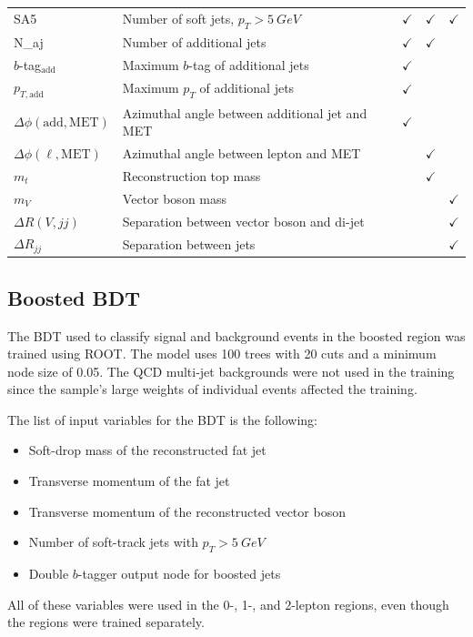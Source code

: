 \begin{table}
\begin{tabularx}{\textwidth}{|l|X|c|c|c|}
    SA5 & Number of soft jets, $p_T > \SI{5}{GeV}$ & $\checkmark$ & $\checkmark$ & $\checkmark$ \\
    N_{aj} & Number of additional jets & $\checkmark$ & $\checkmark$ & \\
    \hline
    $b$-tag$_\mathrm{add}$ & Maximum $b$-tag of additional jets & $\checkmark$ & & \\
    $p_{T,\mathrm{add}}$ & Maximum $p_T$ of additional jets & $\checkmark$ & & \\
    $\Delta\phi(\mathrm{add, MET})$ & Azimuthal angle between additional jet and MET & $\checkmark$ & & \\
    \hline
    $\Delta\phi(\ell, \mathrm{MET})$ & Azimuthal angle between lepton and MET & & $\checkmark$ & \\
    $m_t$ & Reconstruction top mass & & $\checkmark$ & \\
    $m_V$ & Vector boson mass & & & $\checkmark$ \\
    \hline
    $\Delta R(V, jj)$ & Separation between vector boson and di-jet & & & $\checkmark$ \\
    $\Delta R_{jj}$ & Separation between jets & & & $\checkmark$ \\
    \hline
  \end{tabularx}
  \label{tab:dnn-inputs}
\end{table}

\subsection{Boosted BDT}

The BDT used to classify signal and background events in the boosted region
was trained using ROOT.
The model uses 100 trees with 20 cuts and a minimum node size of 0.05.
The QCD multi-jet backgrounds were not used in the training since the sample's large weights
of individual events affected the training.

The list of input variables for the BDT is the following:
\begin{itemize}
\item Soft-drop mass of the reconstructed fat jet
\item Transverse momentum of the fat jet
\item Transverse momentum of the reconstructed vector boson
\item Number of soft-track jets with $p_T > \SI{5}{GeV}$
\item Double $b$-tagger output node for boosted jets
\end{itemize}
All of these variables were used in the 0-, 1-, and 2-lepton regions,
even though the regions were trained separately.


